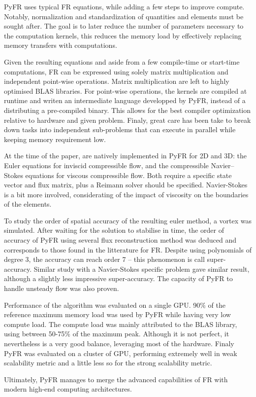 \documentclass[12pt]{article}
\begin{document}
PyFR uses typical FR equations, while adding a few steps to improve compute. Notably, normalization and standardization of quantities and elements must be sought after. The goal is to later reduce the number of parameters necessary to the computation kernels, this reduces the memory load by effectively replacing memory transfers with computations. 

Given the resulting equations and aside from a few compile-time or start-time computations, FR can be expressed using solely matrix multiplication and independent point-wise operations. Matrix multiplication are left to highly optimised BLAS libraries. For point-wise operations, the kernels are compiled at runtime and writen an intermediate language developped by PyFR, instead of a distributing a pre-compiled binary. This allows for the best compiler optimization relative to hardware and given problem. Finaly, great care has been take to break down tasks into independent sub-problems that can execute in parallel while keeping memory requirement low.

At the time of the paper, are natively implemented in PyFR for 2D and 3D: the Euler equations for inviscid compressible flow, and the compressible Navier–Stokes equations for viscous compressible flow. Both require a specific state vector and flux matrix, plus a Reimann solver should be specified. Navier-Stokes is a bit  more involved, considerating of the impact of viscosity on the boundaries of the elements.

To study the order of spatial accuracy of the resulting euler method, a vortex was simulated. After waiting for the solution to stabilise in time, the order of accuracy of PyFR using several flux reconstruction method was deduced and corresponds to those found in the litterature for FR. Despite using polynomials of degree 3, the accuracy can reach order 7 -- this phenomenon is call super-accuracy. Similar study with a Navier-Stokes specific problem gave similar result, although a slightly less impressive super-accuracy. The capacity of PyFR to handle unsteady flow was also proven.

Performance of the algorithm was evaluated on a single GPU.  90\% of the reference maximum memory load was used by PyFR while having very low compute load. The compute load was mainly attributed to the BLAS library, using between 50-75\% of the maximum peak. Although it is not perfect, it nevertheless is a very good balance, leveraging most of the hardware. Finaly PyFR was evaluated on a cluster of GPU, performing extremely well in weak scalability metric and a little less so for the strong scalability metric.

Ultimately, PyFR manages to merge the advanced capabilities of FR with modern high-end computing architectures.
\end{document}

